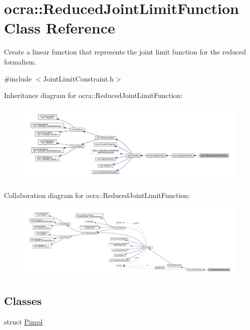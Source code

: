 \hypertarget{classocra_1_1ReducedJointLimitFunction}{}\section{ocra\+:\+:Reduced\+Joint\+Limit\+Function Class Reference}
\label{classocra_1_1ReducedJointLimitFunction}


Create a linear function that represents the joint limit function for the reduced formalism.  




{\ttfamily \#include $<$Joint\+Limit\+Constraint.\+h$>$}



Inheritance diagram for ocra\+:\+:Reduced\+Joint\+Limit\+Function\+:\nopagebreak
\begin{figure}[H]
\begin{center}
\leavevmode
\includegraphics[width=350pt]{d9/d6d/classocra_1_1ReducedJointLimitFunction__inherit__graph}
\end{center}
\end{figure}


Collaboration diagram for ocra\+:\+:Reduced\+Joint\+Limit\+Function\+:\nopagebreak
\begin{figure}[H]
\begin{center}
\leavevmode
\includegraphics[width=350pt]{d9/db4/classocra_1_1ReducedJointLimitFunction__coll__graph}
\end{center}
\end{figure}
\subsection*{Classes}
\begin{DoxyCompactItemize}
\item 
struct \hyperlink{structReducedJointLimitFunction_1_1Pimpl}{Pimpl}
\end{DoxyCompactItemize}
